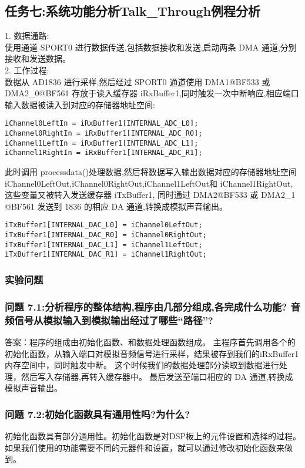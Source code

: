 \documentclass{article}
\begin{document}
\begin{CJK}{UTF8}{gbsn}
\subsection{任务七:系统功能分析Talk\_Through例程分析}
1. 数据通路:\\
使用通道 SPORT0 进行数据传送,包括数据接收和发送,启动两条 DMA 通道,分别接收和发送数据。\\
2. 工作过程:\\
数据从 AD1836 进行采样,然后经过 SPORT0 通道使用 DMA1@BF533 或 DMA2\_0@BF561
存放于读入缓存器 iRxBuffer1,同时触发一次中断响应,相应端口输入数据被读入到对应的存储器地址空间:
\begin{lstlisting}
iChannel0LeftIn = iRxBuffer1[INTERNAL_ADC_L0];
iChannel0RightIn = iRxBuffer1[INTERNAL_ADC_R0];
iChannel1LeftIn = iRxBuffer1[INTERNAL_ADC_L1];
iChannel1RightIn = iRxBuffer1[INTERNAL_ADC_R1];
\end{lstlisting}
此时调用 processdata()处理数据,然后将数据写入输出数据对应的存储器地址空间
iChannel0LeftOut,iChannel0RightOut,iChannel1LeftOut和
iChannel1RightOut,
这些变量又被转入发送缓存器 iTxBuffer1,
同时通过 DMA2@BF533 或 DMA2\_1
@BF561 发送到 1836 的相应 DA 通道,转换成模拟声音输出。
\begin{lstlisting}
iTxBuffer1[INTERNAL_DAC_L0] = iChannel0LeftOut;
iTxBuffer1[INTERNAL_DAC_R0] = iChannel0RightOut;
iTxBuffer1[INTERNAL_DAC_L1] = iChannel1LeftOut;
iTxBuffer1[INTERNAL_DAC_R1] = iChannel1RightOut;
\end{lstlisting}

\subsubsection{实验问题}
\subsubsection*{问题 7.1:分析程序的整体结构,程序由几部分组成,各完成什么功能?
音频信号从模拟输入到模拟输出经过了哪些“路径”?}
答案：程序的组成由初始化函数、和数据处理函数组成。
主程序首先调用各个的初始化函数，从输入端口对模拟音频信号进行采样，结果被存到我们的iRxBuffer1内存空间中，同时触发中断。
这个时候我们的数据处理部分读取到数据进行处理，然后写入存储器,再转入缓存器中。
最后发送至端口相应的 DA 通道,转换成模拟声音输出。
\subsubsection*{问题 7.2:初始化函数具有通用性吗?为什么?}
初始化函数具有部分通用性。初始化函数是对DSP板上的元件设置和选择的过程。
如果我们使用的功能需要不同的元器件和设置，就可以通过修改初始化函数来做到。

\end{CJK}
\end{document}
